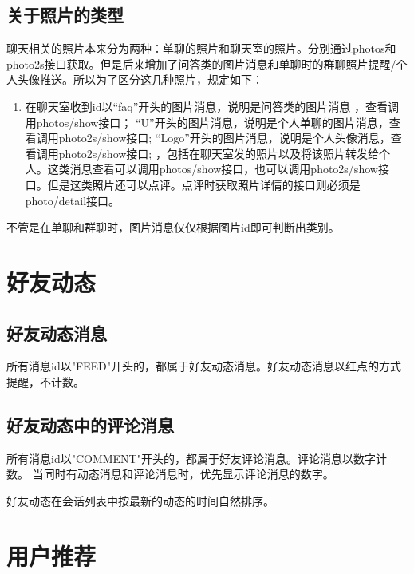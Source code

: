 \subsection{关于照片的类型}
聊天相关的照片本来分为两种：单聊的照片和聊天室的照片。分别通过photos和photo2s接口获取。但是后来增加了问答类的图片消息和单聊时的群聊照片提醒/个人头像推送。所以为了区分这几种照片，规定如下：
\begin{enumerate}
\item 在聊天室收到id以“faq”开头的图片消息，说明是问答类的图片消息 ，查看调用photos/show接口；
“U”开头的图片消息，说明是个人单聊的图片消息，查看调用photo2s/show接口;
“Logo”开头的图片消息，说明是个人头像消息，查看调用photo2s/show接口;
，包括在聊天室发的照片以及将该照片转发给个人。这类消息查看可以调用photos/show接口，也可以调用photo2s/show接口。但是这类照片还可以点评。点评时获取照片详情的接口则必须是photo/detail接口。
\end{enumerate}

不管是在单聊和群聊时，图片消息仅仅根据图片id即可判断出类别。

\section{好友动态}
\subsection{好友动态消息}
所有消息id以"FEED"开头的，都属于好友动态消息。好友动态消息以红点的方式提醒，不计数。
\subsection{好友动态中的评论消息}
所有消息id以"COMMENT"开头的，都属于好友评论消息。评论消息以数字计数。
当同时有动态消息和评论消息时，优先显示评论消息的数字。

好友动态在会话列表中按最新的动态的时间自然排序。






\section{用户推荐}
